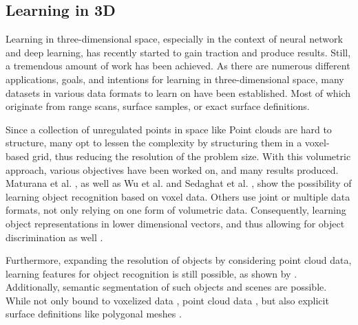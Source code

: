  \subsection{Learning in 3D}
 \label{learn3d}
 Learning in three-dimensional space, especially in the context of neural network and deep learning, has recently
  started to gain traction and produce results. Still, a tremendous amount of work has been achieved. 
 As there are numerous different applications, goals, and intentions for learning in three-dimensional space, many 
 datasets in various data formats to learn on have been established. Most of which originate from range scans, surface samples,
  or exact surface definitions. 
 
 Since a collection of unregulated points in space like Point clouds are hard to structure, many opt to lessen the 
 complexity by structuring them in a voxel-based grid, thus reducing the resolution of the problem size.
 With this volumetric approach, various objectives have been worked on, and many results produced. Maturana et al.
  \cite{Maturana2015VoxNet}, as well as Wu et al.\cite{inproceedings} and Sedaghat et al. \cite{SZB17a}, show the possibility of learning object recognition 
  based on voxel data. Others use joint or multiple data formats, not only relying on one form of volumetric data. Consequently, 
  learning object representations in lower dimensional vectors, and thus allowing for object discrimination as well 
  \cite{articlefusionnet,DBLP:journals/corr/QiSNDYG16,DBLP:journals/corr/BrockLRW16}.

  Furthermore, expanding the resolution of objects by considering point cloud data, learning features for object 
  recognition is still possible, as shown by
   \cite{DBLP:journals/corr/QiSMG16,qi2017pointnetplusplus,DBLP:journals/corr/KlokovL17,DBLP:journals/corr/abs-1801-07791,PointGrid}. Additionally,
    semantic segmentation of such objects and 
  scenes are possible. While not only bound to voxelized data \cite{DBLP:journals/corr/abs-1803-10409,DBLP:journals/corr/abs-1712-10215}, point cloud data \cite{DBLP:journals/corr/QiSMG16,qi2017pointnetplusplus,DBLP:journals/corr/DaiCSHFN17,Groh2017,inproceedingsparse,DBLP:journals/corr/abs-1710-07563}, but also explicit surface
   definitions like polygonal meshes \cite{feng2018meshnet,Kalogerakis:2010:labelMeshes,Sidi:2011:UCS:2024156.2024160,Kalogerakis:2017:ShapePFCN}.
 
 
 
  
 


